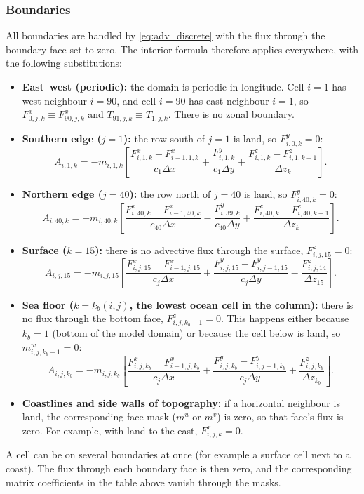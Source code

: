 \documentclass{article}
\begin{document}
\subsubsection*{Boundaries}
All boundaries are handled by \eqref{eq:adv_discrete} with the flux through the boundary face set to zero.
The interior formula therefore applies everywhere, with the following substitutions:
\begin{itemize}
\item \textbf{East--west (periodic):} the domain is periodic in longitude.
Cell $i = 1$ has west neighbour $i = 90$, and cell $i = 90$ has east neighbour $i = 1$, so $F^x_{0,j,k} \equiv F^x_{90,j,k}$ and $T_{91,j,k} \equiv T_{1,j,k}$.
There is no zonal boundary.
\item \textbf{Southern edge ($j = 1$):} the row south of $j = 1$ is land, so $F^y_{i,0,k} = 0$:
\[
A_{i,1,k} = -m_{i,1,k}\left[ \frac{F^x_{i,1,k} - F^x_{i-1,1,k}}{c_1 \Delta x} + \frac{F^y_{i,1,k}}{c_1 \Delta y} + \frac{F^z_{i,1,k} - F^z_{i,1,k-1}}{\Delta z_k} \right].
\]
\item \textbf{Northern edge ($j = 40$):} the row north of $j = 40$ is land, so $F^y_{i,40,k} = 0$:
\[
A_{i,40,k} = -m_{i,40,k}\left[ \frac{F^x_{i,40,k} - F^x_{i-1,40,k}}{c_{40} \Delta x} - \frac{F^y_{i,39,k}}{c_{40} \Delta y} + \frac{F^z_{i,40,k} - F^z_{i,40,k-1}}{\Delta z_k} \right].
\]
\item \textbf{Surface ($k = 15$):} there is no advective flux through the surface, $F^z_{i,j,15} = 0$:
\[
A_{i,j,15} = -m_{i,j,15}\left[ \frac{F^x_{i,j,15} - F^x_{i-1,j,15}}{c_j \Delta x} + \frac{F^y_{i,j,15} - F^y_{i,j-1,15}}{c_j \Delta y} - \frac{F^z_{i,j,14}}{\Delta z_{15}} \right].
\]
\item \textbf{Sea floor ($k = k_b(i,j)$, the lowest ocean cell in the column):} there is no flux through the bottom face, $F^z_{i,j,k_b-1} = 0$.
This happens either because $k_b = 1$ (bottom of the model domain) or because the cell below is land, so $m^w_{i,j,k_b-1} = 0$:
\[
A_{i,j,k_b} = -m_{i,j,k_b}\left[ \frac{F^x_{i,j,k_b} - F^x_{i-1,j,k_b}}{c_j \Delta x} + \frac{F^y_{i,j,k_b} - F^y_{i,j-1,k_b}}{c_j \Delta y} + \frac{F^z_{i,j,k_b}}{\Delta z_{k_b}} \right].
\]
\item \textbf{Coastlines and side walls of topography:} if a horizontal neighbour is land, the corresponding face mask ($m^u$ or $m^v$) is zero, so that face's flux is zero.
For example, with land to the east, $F^x_{i,j,k} = 0$.
\end{itemize}
A cell can be on several boundaries at once (for example a surface cell next to a coast).
The flux through each boundary face is then zero, and the corresponding matrix coefficients in the table above vanish through the masks.
\end{document}
